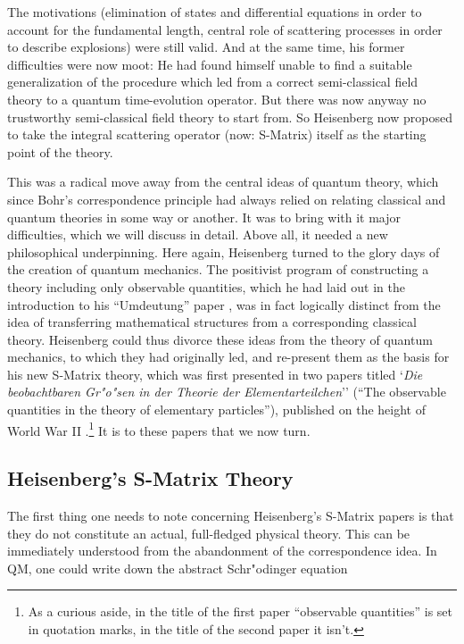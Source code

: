 \documentclass[12pt]{article}
\begin{document}
The motivations (elimination of states and differential equations in order to account for the fundamental length, central role of scattering processes in order to describe explosions) were still valid. And at the same time, his former difficulties were now moot: He had found himself unable to find a suitable generalization of the procedure which led from a correct semi-classical field theory to a quantum time-evolution operator. But there was now anyway no trustworthy semi-classical field theory to start from. So Heisenberg now proposed to take the integral scattering operator (now: S-Matrix) itself as the starting point of the theory.

This was a radical move away from the central ideas of quantum theory, which since Bohr's correspondence principle had always relied on relating classical and quantum theories in some way or another. It was to bring with it major difficulties, which we will discuss in detail. Above all, it needed a new philosophical underpinning. Here again, Heisenberg turned to the glory days of the creation of quantum mechanics. The positivist program of constructing a theory including only observable quantities, which he had laid out in the introduction to his ``Umdeutung'' paper \citep{heisenberg_1925_umdeutung}, was in fact logically distinct from the idea of transferring mathematical structures from a corresponding classical theory. Heisenberg could thus divorce these ideas from the theory of quantum mechanics, to which they had originally led, and re-present them as the basis for his new S-Matrix theory, which was first presented in two papers titled `\emph{Die beobachtbaren Gr"o"sen in der Theorie der Elementarteilchen}'' (``The observable quantities in the theory of elementary particles''), published on the height of World War II \citep{heisenberg_1943_die-beobachtbaren, heisenberg_1943_die-beobachtbarenb}.\footnote{As a curious aside, in the title of the first paper ``observable quantities'' is set in quotation marks, in the title of the second paper it isn't.} It is to these papers that we now turn.

\subsection{Heisenberg's S-Matrix Theory}

The first thing one needs to note concerning Heisenberg's S-Matrix papers is that they do not constitute an actual, full-fledged physical theory. This can be immediately understood from the abandonment of the correspondence idea. In QM, one could write down the abstract Schr"odinger equation
\end{document}
